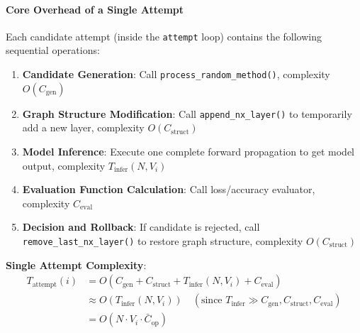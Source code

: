 \paragraph{Core Overhead of a Single Attempt}
Each candidate attempt (inside the \texttt{attempt} loop) contains the following sequential operations:
\begin{enumerate}
    \item \textbf{Candidate Generation}: Call \texttt{process\_random\_method()}, complexity $O(C_{\mathrm{gen}})$
    \item \textbf{Graph Structure Modification}: Call \texttt{append\_nx\_layer()} to temporarily add a new layer, complexity $O(C_{\mathrm{struct}})$
    \item \textbf{Model Inference}: Execute one complete forward propagation to get model output, complexity $T_{\mathrm{infer}}(N, V_i)$
    \item \textbf{Evaluation Function Calculation}: Call loss/accuracy evaluator, complexity $C_{\mathrm{eval}}$
    \item \textbf{Decision and Rollback}: If candidate is rejected, call \texttt{remove\_last\_nx\_layer()} to restore graph structure, complexity $O(C_{\mathrm{struct}})$
\end{enumerate}

\textbf{Single Attempt Complexity}:
\begin{equation}
\begin{aligned}
    T_{\mathrm{attempt}}(i) &= O(C_{\mathrm{gen}} + C_{\mathrm{struct}} + T_{\mathrm{infer}}(N, V_i) + C_{\mathrm{eval}}) \\
    &\approx O(T_{\mathrm{infer}}(N, V_i)) \quad (\text{since } T_{\mathrm{infer}} \gg C_{\mathrm{gen}}, C_{\mathrm{struct}}, C_{\mathrm{eval}}) \\
    &= O(N \cdot V_i \cdot \bar{C}_{\mathrm{op}})
\end{aligned}
\end{equation}

